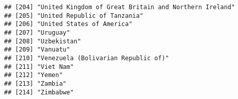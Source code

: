 \documentclass[
]{article}
\newenvironment{Shaded}{\begin{snugshade}}{\end{snugshade}}
\newcommand{\AttributeTok}[1]{\textcolor[rgb]{0.13,0.29,0.53}{#1}}
\newcommand{\CommentTok}[1]{\textcolor[rgb]{0.56,0.35,0.01}{\textit{#1}}}
\newcommand{\ConstantTok}[1]{\textcolor[rgb]{0.56,0.35,0.01}{#1}}
\newcommand{\FunctionTok}[1]{\textcolor[rgb]{0.13,0.29,0.53}{\textbf{#1}}}
\newcommand{\NormalTok}[1]{#1}
\newcommand{\OtherTok}[1]{\textcolor[rgb]{0.56,0.35,0.01}{#1}}
\newcommand{\SpecialCharTok}[1]{\textcolor[rgb]{0.81,0.36,0.00}{\textbf{#1}}}
\newcommand{\StringTok}[1]{\textcolor[rgb]{0.31,0.60,0.02}{#1}}
\begin{document}
\begin{verbatim}
## [204] "United Kingdom of Great Britain and Northern Ireland"                                                                                                 
## [205] "United Republic of Tanzania"                                                                                                                          
## [206] "United States of America"                                                                                                                             
## [207] "Uruguay"                                                                                                                                              
## [208] "Uzbekistan"                                                                                                                                           
## [209] "Vanuatu"                                                                                                                                              
## [210] "Venezuela (Bolivarian Republic of)"                                                                                                                   
## [211] "Viet Nam"                                                                                                                                             
## [212] "Yemen"                                                                                                                                                
## [213] "Zambia"                                                                                                                                               
## [214] "Zimbabwe"
\end{verbatim}

\begin{Shaded}
\end{Shaded}
\end{document}
